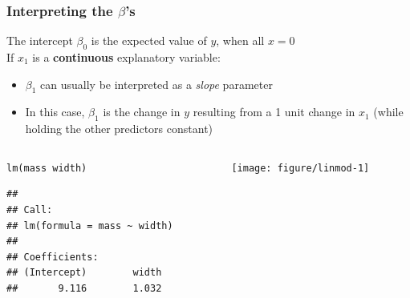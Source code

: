 \documentclass[color=usenames,dvipsnames]{beamer}\usepackage[]{graphicx}\usepackage[]{color}
\makeatletter
\newcommand{\hlopt}[1]{\textcolor[rgb]{0,0,0}{#1}}%
\newcommand{\hlstd}[1]{\textcolor[rgb]{0,0,0}{#1}}%
\newcommand{\hlkwd}[1]{\textcolor[rgb]{0.004,0.004,0.506}{#1}}%
\newenvironment{kframe}{%
 \def\at@end@of@kframe{}%
 \ifinner\ifhmode%
  \def\at@end@of@kframe{\end{minipage}}%
  \begin{minipage}{\columnwidth}%
 \fi\fi%
 \def\FrameCommand##1{\hskip\@totalleftmargin \hskip-\fboxsep
 \colorbox{shadecolor}{##1}\hskip-\fboxsep
     \hskip-\linewidth \hskip-\@totalleftmargin \hskip\columnwidth}%
 \MakeFramed {\advance\hsize-\width
   \@totalleftmargin\z@ \linewidth\hsize
   \@setminipage}}%
 {\par\unskip\endMakeFramed%
 \at@end@of@kframe}
\newenvironment{knitrout}{}{} %
\makeatother
\begin{document}
\begin{frame}[fragile]
  \frametitle{Interpreting the $\beta$'s}
  \small 
  The intercept $\beta_0$ is the expected value of $y$, when all $x=0$ \\
  \pause
  \vfill
  If $x_1$ is a {\bf continuous} explanatory variable: %
  \begin{itemize}
    \item $\beta_1$ can usually be interpreted as a \textit{slope}
      parameter
    \item In this case, $\beta_1$ is the
      change in $y$ resulting from a 1 unit change in $x_1$ (while
      holding the other predictors constant)
    \end{itemize}
\pause
\vfill

\centering
\begin{columns}
  \begin{column}{0.5\textwidth}
\begin{knitrout}\tiny
{}\color{fgcolor}\begin{kframe}
\begin{alltt}
\hlkwd{lm}\hlstd{(mass}\hlopt{~}\hlstd{width)}
\end{alltt}
\begin{verbatim}
## 
## Call:
## lm(formula = mass ~ width)
## 
## Coefficients:
## (Intercept)        width  
##       9.116        1.032
\end{verbatim}
\end{kframe}
\end{knitrout}
  \end{column}
  \begin{column}{0.4\textwidth}
  \texttt{[image: figure/linmod-1]} \\
  \end{column}
\end{columns}
\end{frame}
\end{document}
